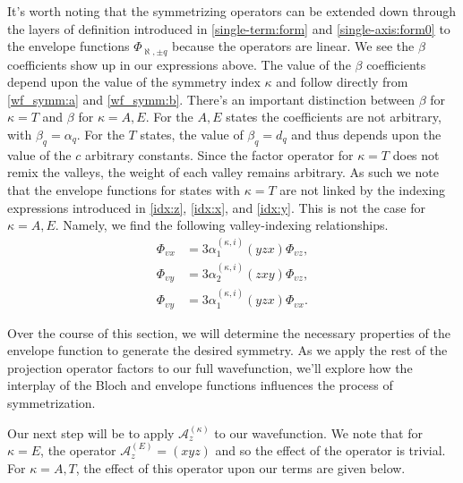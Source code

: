 It's worth noting that the symmetrizing operators can be extended down through
the layers of definition introduced in \eqref{single-term:form} and
\eqref{single-axis:form0} to the envelope functions $\Phi_{\aleph,\pm q}$
because the operators are linear. We see the $\beta$ coefficients show up in our
expressions above. The value of the $\beta$ coefficients depend upon the value
of the symmetry index $\kappa$ and follow directly from \eqref{wf_symm:a} and
\eqref{wf_symm:b}. There's an important distinction between $\beta$ for $\kappa
= T$ and $\beta$ for $\kappa = A,E$. For the $A,E$ states the coefficients are
not arbitrary, with $\beta_{q} = \alpha_{q}$. For the $T$ states, the value of
$\beta_{q} = d_{q}$ and thus depends upon the value of the $c$ arbitrary
constants. Since the factor operator for $\kappa = T$ does not remix the
valleys, the weight of each valley remains arbitrary. As such we note that the
envelope functions for states with $\kappa = T$ are not linked by the indexing
expressions introduced in \eqref{idx:z}, \eqref{idx:x}, and \eqref{idx:y}. This
is not the case for $\kappa = A,E$. Namely, we find the following
valley-indexing relationships.
\begin{align}
  \Phi_{\upsilon x}
  &=
  3\alpha_{1}^{\left(\kappa,i\right)}\left(yzx\right)
  \Phi_{\upsilon z},
\label{idx:env:xz}
\\
  \Phi_{\upsilon y}
  &=
  3\alpha_{2}^{\left(\kappa,i\right)}\left(zxy\right)
  \Phi_{\upsilon z},
\label{idx:env:yz}
\\
  \Phi_{\upsilon y}
  &=
  3\alpha_{1}^{\left(\kappa,i\right)}\left(yzx\right)
  \Phi_{\upsilon x}.
\label{idx:env:yx}
\end{align}

Over the course of this section, we will determine the necessary properties of
the envelope function to generate the desired symmetry. As we apply the rest of
the projection operator factors to our full wavefunction, we'll explore how the
interplay of the Bloch and envelope functions influences the process of
symmetrization.

Our next step will be to apply $\mathcal{A}_{z}^{\left(\kappa\right)}$ to our
wavefunction. We note that for $\kappa = E$, the operator
$\mathcal{A}_{z}^{\left(E\right)} = \left(xyz\right)$ and so the effect of the
operator is trivial. For $\kappa = A,T$, the effect of this operator upon our
terms are given below.

